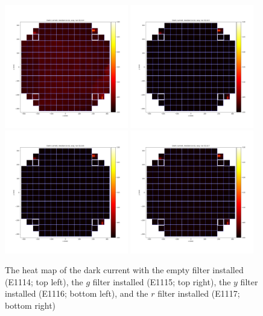 \begin{figure}[ht]
\begin{centering}
\includegraphics[width=0.48\textwidth]{figures/E1114_Empty_DarkCurrent.png}
\includegraphics[width=0.48\textwidth]{figures/E1115_g_DarkCurrent.png} \\
\includegraphics[width=0.48\textwidth]{figures/E1116_y_DarkCurrent.png}
\includegraphics[width=0.48\textwidth]{figures/E1117_r_DarkCurrent.png}
\caption{ The heat map of the dark current with the empty filter installed (E1114; top left), the $g$ filter installed (E1115; top right), the $y$ filter installed (E1116; bottom left), and the $r$ filter installed (E1117; bottom right)  \label{fig:filter-darkcurrent}}
\end{centering}
\end{figure}

